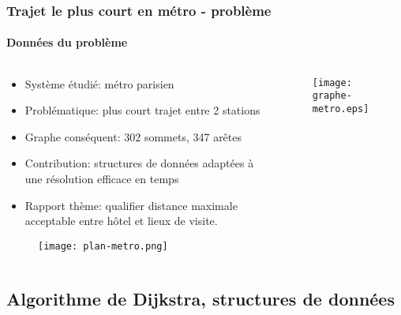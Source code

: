 \documentclass[10pt]{beamer}
\begin{document}
\begin{frame}
\frametitle{Trajet le plus court en métro - problème}
\framesubtitle{Données du problème}
\begin{columns}[T]
\begin{column}{0.75\textwidth}
\small
\begin{itemize}
\item Système étudié: métro parisien
\item Problématique: plus court trajet entre 2 stations
\item Graphe conséquent: 302 sommets, 347 arêtes
\item Contribution: structures de données adaptées à une résolution efficace en temps
 \item Rapport thème: qualifier distance maximale acceptable entre hôtel et lieux de visite.
\end{itemize}
\begin{figure}
\centering
\vspace{-0.3cm}\texttt{[image: plan-metro.png]}
\end{figure}
\end{column}
\begin{column}{0.25\textwidth}
\begin{figure}
\vspace{-1cm}\texttt{[image: graphe-metro.eps]}
\end{figure}
\end{column}
\end{columns}
\end{frame}

\subsection{Algorithme de Dijkstra, structures de données}
\end{document}
